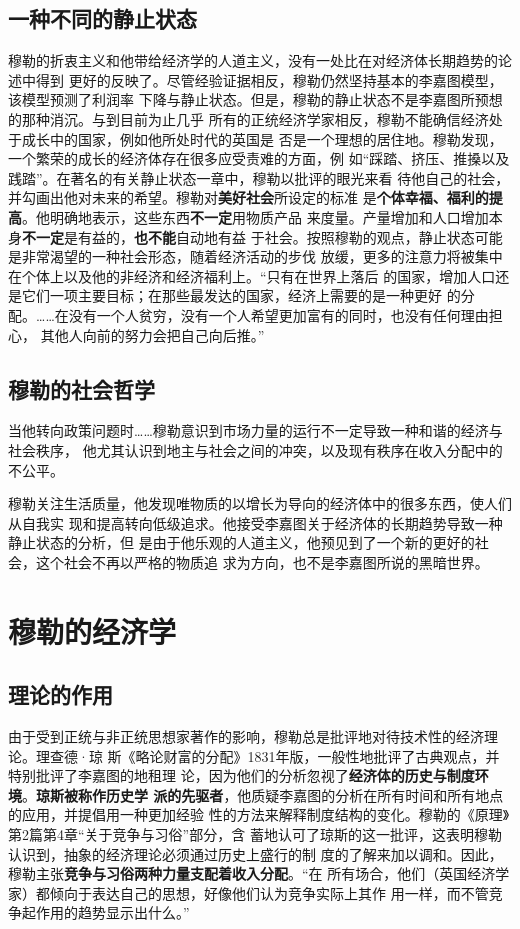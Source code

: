 \subsection{一种不同的静止状态}

穆勒的折衷主义和他带给经济学的人道主义，没有一处比在对经济体长期趋势的论述中得到
更好的反映了。尽管经验证据相反，穆勒仍然坚持基本的李嘉图模型，该模型预测了利润率
下降与静止状态。但是，穆勒的静止状态不是李嘉图所预想的那种消沉。与到目前为止几乎
所有的正统经济学家相反，穆勒不能确信经济处于成长中的国家，例如他所处时代的英国是
否是一个理想的居住地。穆勒发现，一个繁荣的成长的经济体存在很多应受责难的方面，例
如“踩踏、挤压、推搡以及践踏”。在著名的有关静止状态一章中，穆勒以批评的眼光来看
待他自己的社会，并勾画出他对未来的希望。穆勒对\textbf{美好社会}所设定的标准
是\textbf{个体幸福、福利的提高}。他明确地表示，这些东西\textbf{不一定}用物质产品
来度量。产量增加和人口增加本身\textbf{不一定}是有益的，\textbf{也不能}自动地有益
于社会。按照穆勒的观点，静止状态可能是非常渴望的一种社会形态，随着经济活动的步伐
放缓，更多的注意力将被集中在个体上以及他的非经济和经济福利上。“只有在世界上落后
的国家，增加人口还是它们一项主要目标；在那些最发达的国家，经济上需要的是一种更好
的分配。……在没有一个人贫穷，没有一个人希望更加富有的同时，也没有任何理由担心，
其他人向前的努力会把自己向后推。”

\subsection{穆勒的社会哲学}

当他转向政策问题时……穆勒意识到市场力量的运行不一定导致一种和谐的经济与社会秩序，
他尤其认识到地主与社会之间的冲突，以及现有秩序在收入分配中的不公平。

穆勒关注生活质量，他发现唯物质的以增长为导向的经济体中的很多东西，使人们从自我实
现和提高转向低级追求。他接受李嘉图关于经济体的长期趋势导致一种静止状态的分析，但
是由于他乐观的人道主义，他预见到了一个新的更好的社会，这个社会不再以严格的物质追
求为方向，也不是李嘉图所说的黑暗世界。

\section{穆勒的经济学}

\subsection{理论的作用}

由于受到正统与非正统思想家著作的影响，穆勒总是批评地对待技术性的经济理论。理查德·琼
斯《略论财富的分配》1831年版，一般性地批评了古典观点，并特别批评了李嘉图的地租理
论，因为他们的分析忽视了\textbf{经济体的历史与制度环境}。\textbf{琼斯被称作历史学
  派的先驱者}，他质疑李嘉图的分析在所有时间和所有地点的应用，并提倡用一种更加经验
性的方法来解释制度结构的变化。穆勒的《原理》第2篇第4章“关于竞争与习俗”部分，含
蓄地认可了琼斯的这一批评，这表明穆勒认识到，抽象的经济理论必须通过历史上盛行的制
度的了解来加以调和。因此，穆勒主张\textbf{竞争与习俗两种力量支配着收入分配}。“在
所有场合，他们（英国经济学家）都倾向于表达自己的思想，好像他们认为竞争实际上其作
用一样，而不管竞争起作用的趋势显示出什么。”

